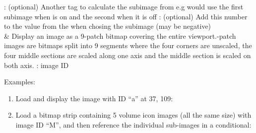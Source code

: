 \begin{tagmap}
          : (optional) Another tag to calculate the subimage from e.g  would
          use the first subimage when  is on and the second when it is off\newline
          : (optional) Add this number to the value from the  when
          chosing the subimage (may be negative)\\
        & Display an image as a 9-patch bitmap covering the entire viewport.-patch images are bitmaps split into 9 segments where the four corners
          are unscaled, the four middle sections are scaled along one axis and the middle
          section is scaled on both axis.\newline
          : image ID\\

  \end{tagmap}

Examples:
\begin{enumerate}
\item Load and display the image  with ID ``a'' at 37, 109:\\
\item Load a bitmap strip containing 5 volume icon images (all the same size)
with image ID ``M'', and then reference the individual sub-images in a conditional:\\
\\
\end{enumerate}



